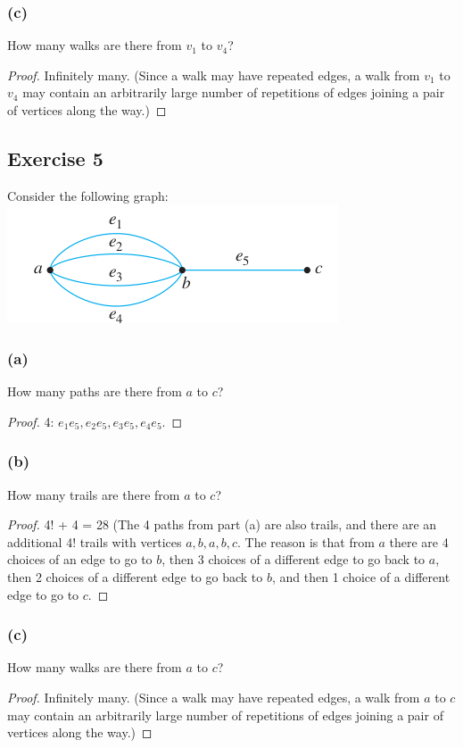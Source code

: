 \documentclass[14pt]{extarticle}
\begin{document}
\subsubsection{(c)}
How many walks are there from \(v_1\) to \(v_4\)?
\begin{proof}
    Infinitely many. (Since a walk may have repeated edges, a walk from \(v_1\) to \(v_4\) may contain an arbitrarily large
    number of repetitions of edges joining a pair of vertices along the way.)
\end{proof}

\subsection{Exercise 5}
Consider the following graph:
\includegraphics[scale=0.5]{../images/10.1.5.png}

\subsubsection{(a)}
How many paths are there from \(a\) to \(c\)?
\begin{proof}
    4: \(e_1e_5, e_2e_5, e_3e_5, e_4e_5\).
\end{proof}

\subsubsection{(b)}
How many trails are there from \(a\) to \(c\)?
\begin{proof}
    4! + 4 = 28 (The 4 paths from part (a) are also trails, and there are an additional 4! trails with vertices \(a,b,a,b,c\).
    The reason is that from \(a\) there are 4 choices of an edge to go to \(b\), then 3 choices of a different edge to go back
    to \(a\), then 2 choices of a different edge to go back to \(b\), and then 1 choice of a different edge to go to \(c\).
\end{proof}

\subsubsection{(c)}
How many walks are there from \(a\) to \(c\)?
\begin{proof}
    Infinitely many. (Since a walk may have repeated edges, a walk from \(a\) to \(c\) may contain an arbitrarily large number of
    repetitions of edges joining a pair of vertices along the way.)
\end{proof}
\end{document}
